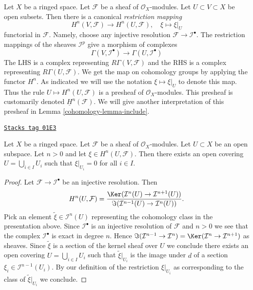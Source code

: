 Let $X$ be a ringed space.
Let $\mathcal{F}$ be a sheaf of $\mathcal{O}_X$-modules.
Let $U \subset V \subset X$ be open subsets.
Then there is a canonical {\it restriction mapping}
\begin{equation}
\label{equation-restriction-mapping}
H^n(V, \mathcal{F})
\longrightarrow
H^n(U, \mathcal{F}), \quad
\xi \longmapsto \xi|_U
\end{equation}
functorial in $\mathcal{F}$. Namely, choose any injective
resolution $\mathcal{F} \to \mathcal{I}^\bullet$. The restriction
mappings of the sheaves $\mathcal{I}^p$ give a morphism of complexes
$$
\Gamma(V, \mathcal{I}^\bullet)
\longrightarrow
\Gamma(U, \mathcal{I}^\bullet)
$$
The LHS is a complex representing $R\Gamma(V, \mathcal{F})$
and the RHS is a complex representing $R\Gamma(U, \mathcal{F})$.
We get the map on cohomology groups by applying the functor $H^n$.
As indicated we will use the notation $\xi \mapsto \xi|_U$ to denote this map.
Thus the rule $U \mapsto H^n(U, \mathcal{F})$ is a presheaf of
$\mathcal{O}_X$-modules. This presheaf is customarily denoted
$\underline{H}^n(\mathcal{F})$. We will give another interpretation
of this presheaf in Lemma \ref{cohomology-lemma-include}.

\begin{lemma}
\label{cohomology-lemma-kill-cohomology-class-on-covering}
\href{https://stacks.math.columbia.edu/tag/01E3}{\texttt{Stacks tag 01E3}}

Let $X$ be a ringed space.
Let $\mathcal{F}$ be a sheaf of $\mathcal{O}_X$-modules.
Let $U \subset X$ be an open subspace.
Let $n > 0$ and let $\xi \in H^n(U, \mathcal{F})$.
Then there exists an open covering
$U = \bigcup_{i\in I} U_i$ such that $\xi|_{U_i} = 0$ for
all $i \in I$.
\end{lemma}

\begin{proof}
Let $\mathcal{F} \to \mathcal{I}^\bullet$ be an injective resolution.
Then
$$
H^n(U, \mathcal{F}) =
\frac{\Ker(\mathcal{I}^n(U) \to \mathcal{I}^{n + 1}(U))}
{\Im(\mathcal{I}^{n - 1}(U) \to \mathcal{I}^n(U))}.
$$
Pick an element $\tilde \xi \in \mathcal{I}^n(U)$ representing the
cohomology class in the presentation above. Since $\mathcal{I}^\bullet$
is an injective resolution of $\mathcal{F}$ and $n > 0$ we see that
the complex $\mathcal{I}^\bullet$ is exact in degree $n$. Hence
$\Im(\mathcal{I}^{n - 1} \to \mathcal{I}^n) =
\Ker(\mathcal{I}^n \to \mathcal{I}^{n + 1})$ as sheaves.
Since $\tilde \xi$ is a section of the kernel sheaf over $U$
we conclude there exists an open covering $U = \bigcup_{i \in I} U_i$
such that $\tilde \xi|_{U_i}$ is the image under $d$ of a section
$\xi_i \in \mathcal{I}^{n - 1}(U_i)$. By our definition of the
restriction $\xi|_{U_i}$ as corresponding to the class of
$\tilde \xi|_{U_i}$ we conclude.
\end{proof}

